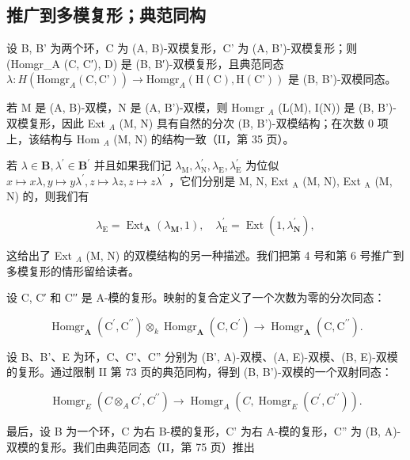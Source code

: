 \subsection{推广到多模复形；典范同构}

设 B, B' 为两个环，C 为 (A, B)-双模复形，C' 为 (A, B')-双模复形；则 (Homgr\_A (C, C′), D) 是 (B, B′)-双模复形，且典范同态 \(\lambda: H(\text{Homgr}_A (\text{C}, \text{C'})) \to \text{Homgr}_A (\text{H}(\text{C}), \text{H}(\text{C'}))\) 是 (B, B')-双模同态。

若 M 是 (A, B)-双模，N 是 (A, B')-双模，则 Homgr \(_{A}\) (L(M), I(N)) 是 (B, B')-双模复形，因此 Ext \(_{A}\) (M, N) 具有自然的分次 (B, B')-双模结构；在次数 0 项上，该结构与 Hom \(_{A}\) (M, N) 的结构一致（II，第 35 页）。

若 \(\lambda\in\mathbf{B},\lambda^{\prime}\in\mathbf{B}^{\prime}\) 并且如果我们记 \(\lambda_{\mathrm{M}},\lambda_{\mathrm{N}}^{\prime},\lambda_{\mathrm{E}},\lambda_{\mathrm{E}}^{\prime}\) 为位似 \(x\mapsto x\lambda,y\mapsto y\lambda^{\prime},z\mapsto\lambda z,z\mapsto z\lambda^{\prime}\) ，它们分别是 M, N, Ext \(_{\mathrm{A}}\) (M, N), Ext \(_{\mathrm{A}}\) (M, N) 的，则我们有

\[
\lambda_ {\mathrm{E}} = \operatorname{Ext} _ {\mathbf {A}} \left(\lambda_ {\mathbf {M}}, 1\right), \quad \lambda_ {\mathrm{E}} ^ {\prime} = \operatorname{Ext} \left(1, \lambda_ {\mathbf {N}} ^ {\prime}\right),
\]

这给出了 Ext \(_{A}\) (M, N) 的双模结构的另一种描述。我们把第 4 号和第 6 号推广到多模复形的情形留给读者。

设 C, C′ 和 C′′ 是 A-模的复形。映射的复合定义了一个次数为零的分次同态：

\[
\operatorname{Homgr} _ {\mathbf {A}} \left(\mathrm{C} ^ {\prime}, \mathrm{C} ^ {\prime \prime}\right) \otimes_ {k} \operatorname{Homgr} _ {\mathbf {A}} \left(\mathrm{C}, \mathrm{C} ^ {\prime}\right)\rightarrow \operatorname{Homgr} _ {\mathbf {A}} \left(\mathrm{C}, \mathrm{C} ^ {\prime \prime}\right).\tag{14}
\]

设 B、B'、E 为环，C、C'、C'' 分别为 (B', A)-双模、(A, E)-双模、(B, E)-双模的复形。通过限制 II 第 73 页的典范同构，得到 (B, B')-双模的一个双射同态：

\[
\operatorname{Homgr} _ {E} \left(C \otimes_ {A} C ^ {\prime}, C ^ {\prime \prime}\right)\rightarrow \operatorname{Homgr} _ {A} \left(C, \operatorname{Homgr} _ {E} \left(C ^ {\prime}, C ^ {\prime \prime}\right)\right).\tag{15}
\]

最后，设 B 为一个环，C 为右 B-模的复形，C' 为右 A-模的复形，C'' 为 (B, A)-双模的复形。我们由典范同态（II，第 75 页）推出

